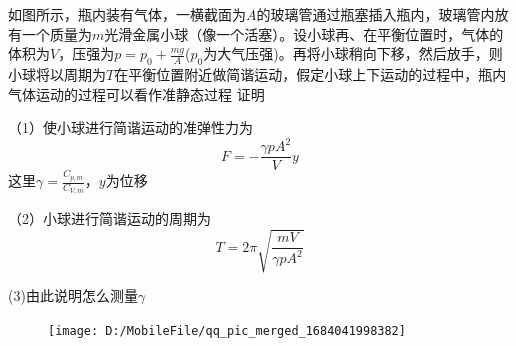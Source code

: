 \documentclass[lang=cn,10pt]{elegantbook}
\begin{document}
	\begin{example}
		如图所示，瓶内装有气体，一横截面为$A$的玻璃管通过瓶塞插入瓶内，玻璃管内放有一个质量为$m$光滑金属小球（像一个活塞）。设小球再、在平衡位置时，气体的体积为$V$，压强为$p=p_{0}+\frac{mg}{A}$($p_{0}$为大气压强)。再将小球稍向下移，然后放手，则小球将以周期为$T$在平衡位置附近做简谐运动，假定小球上下运动的过程中，瓶内气体运动的过程可以看作准静态过程
		证明
		
		（1）使小球进行简谐运动的准弹性力为
		\begin{equation*}
			F=-\frac{\gamma p A^{2}}{V}y
		\end{equation*}
		这里$	\gamma=\frac{	C_{p,m}}{ C_{V,m}}$，$y$为位移
		
		（2）小球进行简谐运动的周期为
		\begin{equation*}
			T=2\pi\sqrt{\frac{mV}{\gamma p A^{2}}}
		\end{equation*}
		
		(3)由此说明怎么测量$\gamma$
		
	\end{example}
	\begin{figure}[H]
		\centering
		\texttt{[image: D:/MobileFile/qq\_pic\_merged\_1684041998382]}
		\caption{}
		\label{fig:qqpicmerged1684041998382}
	\end{figure}
\end{document}
